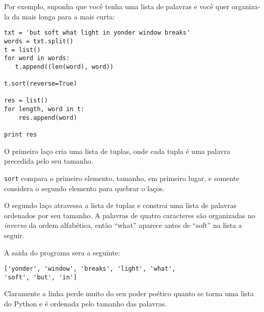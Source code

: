 \label{DSU}

Por exemplo, suponha que você tenha uma lista de palavras e você
quer organiza-la da mais longa para a mais curta:

\beforeverb
\begin{verbatim}
txt = 'but soft what light in yonder window breaks'
words = txt.split()
t = list()
for word in words:
   t.append((len(word), word))

t.sort(reverse=True)

res = list()
for length, word in t:
    res.append(word)

print res
\end{verbatim}
\afterverb
%
O primeiro laço cria uma lista de tuplas, onde cada tupla é
uma palavra precedida pelo seu tamanho.

{\tt sort} compara o primeiro elemento, tamanho, em primeiro lugar, e
somente considera o segundo elemento para quebrar o laços.


O segundo laço atravessa a lista de tuplas e constroi uma lista de 
palavras ordenados por seu tamanho. A palavras de quatro caracteres
são organizadas no {\em inverso} da ordem alfabética, então ``what''
aparece antes de ``soft'' na lista a seguir.

A saida do programa sera a seguinte:
%
\beforeverb
\begin{verbatim}
['yonder', 'window', 'breaks', 'light', 'what', 
'soft', 'but', 'in']
\end{verbatim}
\afterverb
%
Claramente a linha perde muito do seu poder poético
quanto se torna uma lista do Python e é ordenada
pelo tamanho das palavras.

